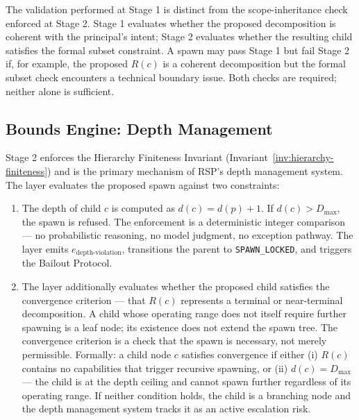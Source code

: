 The validation performed at Stage 1 is distinct from the scope-inheritance check enforced at Stage 2. Stage 1 evaluates whether the proposed decomposition is coherent with the principal's intent; Stage 2 evaluates whether the resulting child satisfies the formal subset constraint. A spawn may pass Stage 1 but fail Stage 2 if, for example, the proposed $R(c)$ is a coherent decomposition but the formal subset check encounters a technical boundary issue. Both checks are required; neither alone is sufficient.

\subsection{Bounds Engine: Depth Management}
\label{sec:rsp-bounds-depth}

Stage 2 enforces the Hierarchy Finiteness Invariant (Invariant~\ref{inv:hierarchy-finiteness}) and is the primary mechanism of RSP's depth management system. The \bounds{} layer evaluates the proposed spawn against two constraints:

\begin{enumerate}
\item[$\mathbf{D_{\max}\text{ enforcement}.}$] The depth of child $c$ is computed as $d(c) = d(p) + 1$. If $d(c) > D_{\max}$, the spawn is refused. The enforcement is a deterministic integer comparison — no probabilistic reasoning, no model judgment, no exception pathway. The \bounds{} layer emits $e_{\text{depth-violation}}$, transitions the parent to \texttt{SPAWN\_LOCKED}, and triggers the Bailout Protocol.

\item[$\mathbf{Convergence criteria.}$] The \bounds{} layer additionally evaluates whether the proposed child satisfies the convergence criterion — that $R(c)$ represents a terminal or near-terminal decomposition. A child whose operating range does not itself require further spawning is a leaf node; its existence does not extend the spawn tree. The convergence criterion is a check that the spawn is necessary, not merely permissible. Formally: a child node $c$ satisfies convergence if either (i) $R(c)$ contains no capabilities that trigger recursive spawning, or (ii) $d(c) = D_{\max}$ — the child is at the depth ceiling and cannot spawn further regardless of its operating range. If neither condition holds, the child is a branching node and the depth management system tracks it as an active escalation risk.
\end{enumerate}

